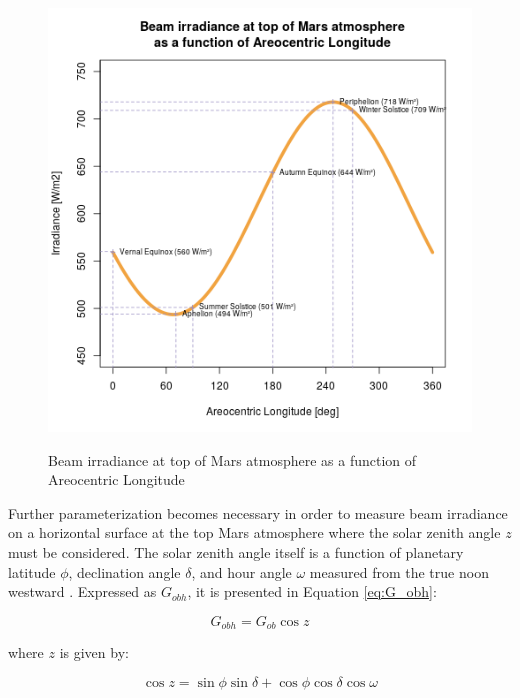 \begin{figure}[H]
  \centering
  \hypersetup{linkcolor=captionTextColor}
  \includegraphics[width=0.8\linewidth]{sections/martian-environment/plots/beam-irradiance-at-top-of-mars-atmosphere-as-a-function-of-areocentric-longitude.png}\\
  \caption[Beam irradiance at top of Mars atmosphere as a function of Areocentric Longitude]
          {Beam irradiance at top of Mars atmosphere as a function of Areocentric Longitude}
  \label{fig:plot:beam-irradiance-top-of-mars-atmosphere}
\end{figure}

Further parameterization becomes necessary in order to measure beam irradiance on a horizontal surface at the top Mars atmosphere where the solar zenith angle $z$ must be considered. The solar zenith angle itself is a function of planetary latitude $\phi$, declination angle $\delta$, and hour angle $\omega$ measured from the true noon westward . Expressed as $G_{obh}$, it is presented in Equation \ref{eq:G_obh}:

\begin{equation}
  \label{eq:G_obh}
  G_{obh} = G_{ob}\cos{z}
\end{equation}

where $z$ is given by:

\begin{equation}
  \label{eq:cosz}
  \cos{z} = \sin{\phi}\sin{\delta} + \cos{\phi}\cos{\delta}\cos{\omega}
\end{equation}

